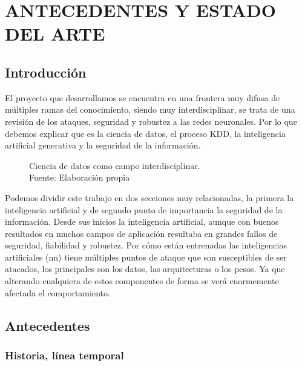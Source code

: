 \chapter{ANTECEDENTES Y ESTADO DEL ARTE}
\label{ch:2}
\section{Introducción}

El proyecto que desarrollamos se encuentra en una frontera muy difusa de múltiples ramas del conocimiento, siendo muy interdisciplinar, se trata de una revisión de los ataques, seguridad y robustez a las redes neuronales.
Por lo que debemos explicar que es la ciencia de datos, el proceso \gls{KDD}, la inteligencia artificial generativa y la seguridad de la información.

\begin{figure}[H]
  \centering
  \centerline{}
  \caption{Ciencia de datos como campo interdisciplinar.\\Fuente: Elaboración propia}
  \label{fig:ciencia-de-datos}
\end{figure}

Podemos dividir este trabajo en dos secciones muy relacionadas, la primera la inteligencia artificial y de segundo punto de importancia la seguridad de la información.
Desde sus inicios la inteligencia artificial, aunque con buenos resultados en muchos campos de aplicación resultaba en grandes fallos de seguridad, fiabilidad y robustez.
Por cómo están entrenadas las inteligencias artificiales (\acrshort{nn}) tiene múltiples puntos de ataque que son susceptibles de ser atacados, los principales son los datos, las arquitecturas o los pesos.
Ya que alterando cualquiera de estos componentes de forma se verá enormemente afectada el comportamiento.



\section{Antecedentes}

\subsection{Historia, línea temporal}

